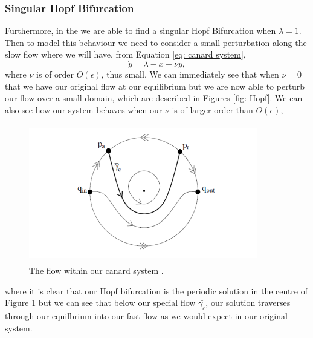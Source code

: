 \subsubsection{Singular Hopf Bifurcation}\label{sec:singular-hopf-bifurcation}
Furthermore, in the \vdp we are able to find a singular Hopf Bifurcation when $ \lambda=1 $. Then to model this behaviour we need to consider a small perturbation along the slow flow where we will have, from Equation \ref{eq: canard system},%
\begin{equation}
\dot{y}=\lambda-x+\bar{\nu} y,
\end{equation}
where $ \nu $ is of order $ O(\epsilon) $, thus small. We can immediately see that when $ \bar{\nu}=0 $ that we have our original flow at our equilibrium but we are now able to perturb our flow over a small domain, which are described in Figures \ref{fig: Hopf}. We can also see how our system behaves when our $ \nu $ is of larger order than $ O(\epsilon) $,

\begin{figure}[h]\centering
	\includegraphics[height=6cm,width=10cm]{Images/CanardPointcircle}
	\caption{The flow within our canard system \citep{krupa2001}.}
	\label{fig: canard flow circle}
\end{figure}
where it is clear that our Hopf bifurcation is the periodic solution in the centre of Figure \ref{fig: canard flow circle} but we can see that below our special flow $ \bar{\gamma_c} $, our solution traverses through our equilbrium into our fast flow as we would expect in our original system.


